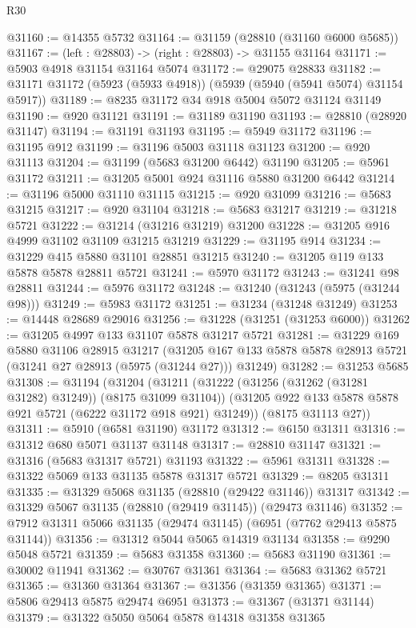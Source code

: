 \begin{lexlean}{R30}
\begin{coremodule}
@31160 := @14355 @5732
@31164 := @31159 (@28810 (@31160 @6000 @5685))
@31167 := (left : @28803) -> (right : @28803) -> @31155 @31164
@31171 := @5903 @4918 @31154 @31164 @5074
@31172 := @29075 @28833
@31182 := @31171 @31172 (@5923 (@5933 @4918)) (@5939 (@5940 (@5941 @5074) @31154 @5917))
@31189 := @8235 @31172 @34 @918 @5004 @5072 @31124 @31149
@31190 := @920 @31121
@31191 := @31189 @31190
@31193 := @28810 (@28920 @31147)
@31194 := @31191 @31193
@31195 := @5949 @31172
@31196 := @31195 @912
@31199 := @31196 @5003 @31118 @31123
@31200 := @920 @31113
@31204 := @31199 (@5683 @31200 @6442) @31190
@31205 := @5961 @31172
@31211 := @31205 @5001 @924 @31116 @5880 @31200 @6442
@31214 := @31196 @5000 @31110 @31115
@31215 := @920 @31099
@31216 := @5683 @31215
@31217 := @920 @31104
@31218 := @5683 @31217
@31219 := @31218 @5721
@31222 := @31214 (@31216 @31219) @31200
@31228 := @31205 @916 @4999 @31102 @31109 @31215 @31219
@31229 := @31195 @914
@31234 := @31229 @415 @5880 @31101 @28851 @31215
@31240 := @31205 @119 @133 @5878 @5878 @28811 @5721
@31241 := @5970 @31172
@31243 := @31241 @98 @28811
@31244 := @5976 @31172
@31248 := @31240 (@31243 (@5975 (@31244 @98)))
@31249 := @5983 @31172
@31251 := @31234 (@31248 @31249)
@31253 := @14448 @28689 @29016
@31256 := @31228 (@31251 (@31253 @6000))
@31262 := @31205 @4997 @133 @31107 @5878 @31217 @5721
@31281 := @31229
    @169
    @5880
    @31106
    @28915
    @31217
    (@31205 @167 @133 @5878 @5878 @28913 @5721 (@31241 @27 @28913 (@5975 (@31244 @27))) @31249)
@31282 := @31253 @5685
@31308 := @31194
    (@31204
      (@31211
        (@31222 (@31256 (@31262 (@31281 @31282) @31249)) (@8175 @31099 @31104))
        (@31205 @922 @133 @5878 @5878 @921 @5721 (@6222 @31172 @918 @921) @31249))
      (@8175 @31113 @27))
@31311 := @5910 (@6581 @31190) @31172
@31312 := @6150 @31311
@31316 := @31312 @680 @5071 @31137 @31148
@31317 := @28810 @31147
@31321 := @31316 (@5683 @31317 @5721) @31193
@31322 := @5961 @31311
@31328 := @31322 @5069 @133 @31135 @5878 @31317 @5721
@31329 := @8205 @31311
@31335 := @31329 @5068 @31135 (@28810 (@29422 @31146)) @31317
@31342 := @31329 @5067 @31135 (@28810 (@29419 @31145)) (@29473 @31146)
@31352 := @7912 @31311 @5066 @31135 (@29474 @31145) (@6951 (@7762 @29413 @5875 @31144))
@31356 := @31312 @5044 @5065 @14319 @31134
@31358 := @9290 @5048 @5721
@31359 := @5683 @31358
@31360 := @5683 @31190
@31361 := @30002 @11941
@31362 := @30767 @31361
@31364 := @5683 @31362 @5721
@31365 := @31360 @31364
@31367 := @31356 (@31359 @31365)
@31371 := @5806 @29413 @5875 @29474 @6951
@31373 := @31367 (@31371 @31144)
@31379 := @31322 @5050 @5064 @5878 @14318 @31358 @31365

\end{coremodule}
\end{lexlean}
